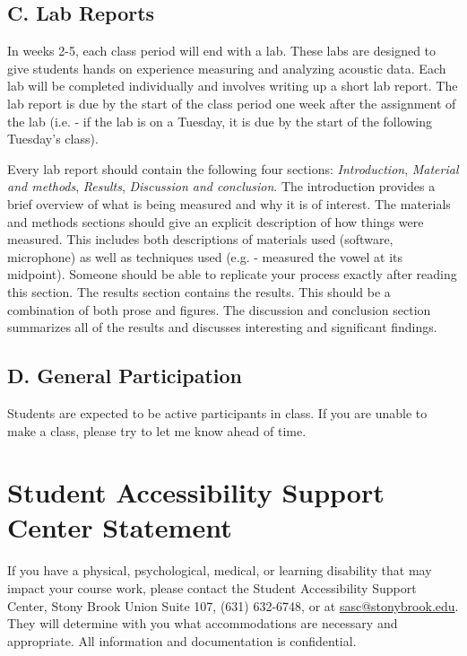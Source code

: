 \documentclass[11pt]{article}
\begin{document}
\subsection*{C. Lab Reports}

In weeks 2-5, each class period will end with a lab.
These labs are designed to give students hands on experience measuring and analyzing acoustic data. 
Each lab will be completed individually and involves writing up a short lab report.
The lab report is due by the start of the class period one week after the assignment of the lab (i.e. - if the lab is on a Tuesday, it is due by the start of the following Tuesday's class).

Every lab report should contain the following four sections: \textit{Introduction}, \textit{Material and methods}, \textit{Results}, \textit{Discussion and conclusion}. 
The introduction provides a brief overview of what is being measured and why it is of interest. 
The materials and methods sections should give an explicit description of how things were measured.
This includes both descriptions of materials used (software, microphone) as well as techniques used (e.g. - measured the vowel at its midpoint).
Someone should be able to replicate your process exactly after reading this section.
The results section contains the results.
This should be a combination of both prose and figures.
The discussion and conclusion section summarizes all of the results and discusses interesting and significant findings.

\subsection*{D. General Participation}

Students are expected to be active participants in class.
If you are unable to make a class, please try to let me know ahead of time.


\section*{Student Accessibility Support Center Statement}

If you have a physical, psychological, medical, or learning disability that may impact your course work, please contact the Student Accessibility Support Center, Stony Brook Union Suite 107, (631) 632-6748, or at \href{mailto:sasc@stonybrook.edu}{sasc@stonybrook.edu}. They will determine with you what accommodations are necessary and appropriate. All information and documentation is confidential.
\end{document}

